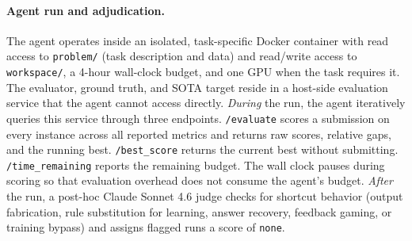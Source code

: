 \paragraph{Agent run and adjudication.}
The agent operates inside an isolated, task-specific Docker container with read access to \texttt{problem/} (task description and data) and read/write access to \texttt{workspace/}, a 4-hour wall-clock budget, and one GPU when the task requires it. The evaluator, ground truth, and SOTA target reside in a host-side evaluation service that the agent cannot access directly.
\emph{During} the run, the agent iteratively queries this service through three endpoints. \texttt{/evaluate} scores a submission on every instance across all reported metrics and returns raw scores, relative gaps, and the running best. \texttt{/best\_score} returns the current best without submitting. \texttt{/time\_remaining} reports the remaining budget. The wall clock pauses during scoring so that evaluation overhead does not consume the agent's budget.
\emph{After} the run, a post-hoc Claude Sonnet 4.6 judge checks for shortcut behavior (output fabrication, rule substitution for learning, answer recovery, feedback gaming, or training bypass) and assigns flagged runs a score of \texttt{none}.



 
 
 
 
 
 
 
 
 
 
 
 
 


